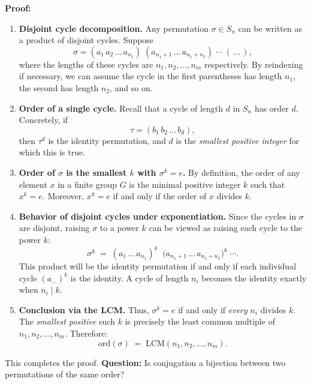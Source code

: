 \documentclass[12pt]{article}
\theoremstyle{definition} %
\theoremstyle{plain} %
\begin{document}
\noindent
\textbf{Proof:}
\begin{enumerate}
    \item \textbf{Disjoint cycle decomposition.}
    Any permutation $\sigma \in S_n$ can be written as a product of disjoint cycles.  Suppose 
    \[
      \sigma = (a_1 \, a_2 \, \dots \, a_{n_1})\; (a_{n_1+1} \, \dots \, a_{n_1+n_2}) \;\cdots\; (\,\dots\,),
    \]
    where the lengths of these cycles are $n_1, n_2, \dots, n_m$ respectively.  By reindexing if necessary, we can assume the cycle in the first parentheses has length $n_1$, the second has length $n_2$, and so on.

    \item \textbf{Order of a single cycle.} 
    Recall that a cycle of length $d$ in $S_n$ has order $d$.  Concretely, if 
    \[
       \tau = (b_1 \, b_2 \,\dots\, b_d),
    \]
    then $\tau^d$ is the identity permutation, and $d$ is the \emph{smallest positive integer} for which this is true.

    \item \textbf{Order of $\sigma$ is the smallest $k$ with $\sigma^k = e$.}
    By definition, the order of any element $x$ in a finite group $G$ is the minimal positive integer $k$ such that $x^k = e$.  Moreover, $x^k = e$ if and only if the order of $x$ divides $k$.  

    \item \textbf{Behavior of disjoint cycles under exponentiation.}
    Since the cycles in $\sigma$ are disjoint, raising $\sigma$ to a power $k$ can be viewed as raising each cycle to the power $k$:
    \[
      \sigma^k 
      \;=\; (a_1 \,\dots\, a_{n_1})^k \;\;\bigl(a_{n_1+1}\,\dots\, a_{n_1+n_2}\bigr)^k \;\cdots.
    \]
    This product will be the identity permutation if and only if each individual cycle $(a_{\dots})^k$ is the identity.  A cycle of length $n_i$ becomes the identity exactly when $n_i \mid k$.  

    \item \textbf{Conclusion via the LCM.}
    Thus, $\sigma^k = e$ if and only if \emph{every} $n_i$ divides $k$.  The \emph{smallest positive} such $k$ is precisely the least common multiple of $n_1, n_2, \dots, n_m$.  Therefore:
    \[
      \text{ord}(\sigma) 
      \;=\; \mathrm{LCM}(n_1, n_2, \dots, n_m).
    \]

\end{enumerate}

\noindent
This completes the proof.
\noindent
\textbf{Question:} 
Is conjugation a bijection between two permutations of the same order?
\end{document}
